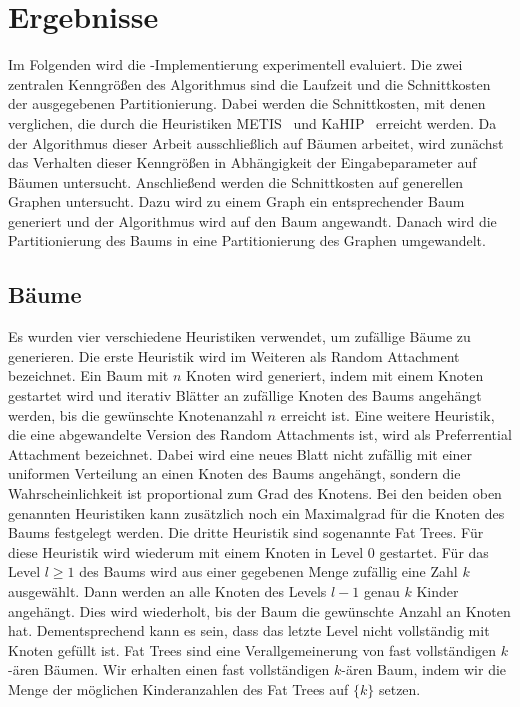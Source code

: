 
\chapter{Ergebnisse}\label{chapter:ergebnisse}
Im Folgenden wird die \Cpp\hyp Implementierung experimentell evaluiert.
Die zwei zentralen Kenngrößen des Algorithmus sind die Laufzeit und die Schnittkosten der ausgegebenen Partitionierung.
Dabei werden die Schnittkosten, mit denen verglichen, die durch die Heuristiken METIS~\cite{KK98} und KaHIP~\cite{SS13} erreicht werden.
Da der Algorithmus dieser Arbeit ausschließlich auf Bäumen arbeitet, wird zunächst das Verhalten dieser Kenngrößen in Abhängigkeit der Eingabeparameter auf Bäumen untersucht.
Anschließend werden die Schnittkosten auf generellen Graphen untersucht.
Dazu wird zu einem Graph ein entsprechender Baum generiert und der Algorithmus wird auf den Baum angewandt.
Danach wird die Partitionierung des Baums in eine Partitionierung des Graphen umgewandelt.

\section{Bäume}
Es wurden vier verschiedene Heuristiken verwendet, um zufällige Bäume zu generieren.
Die erste Heuristik wird im Weiteren als Random Attachment bezeichnet. 
Ein Baum mit $n$ Knoten wird generiert, indem mit einem Knoten gestartet wird und iterativ Blätter an zufällige Knoten des Baums angehängt werden, bis die gewünschte Knotenanzahl $n$ erreicht ist.
Eine weitere Heuristik, die eine abgewandelte Version des Random Attachments ist, wird als Preferrential Attachment bezeichnet.
Dabei wird eine neues Blatt nicht zufällig mit einer uniformen Verteilung an einen Knoten des Baums angehängt, sondern die Wahrscheinlichkeit ist proportional zum Grad des Knotens.
Bei den beiden oben genannten Heuristiken kann zusätzlich noch ein Maximalgrad für die Knoten des Baums festgelegt werden.
Die dritte Heuristik sind sogenannte Fat Trees.
Für diese Heuristik wird wiederum mit einem Knoten in Level $0$ gestartet.
Für das Level $l \geq 1$ des Baums wird aus einer gegebenen Menge zufällig eine Zahl $k$ ausgewählt.
Dann werden an alle Knoten des Levels $l - 1$ genau $k$ Kinder angehängt.
Dies wird wiederholt, bis der Baum die gewünschte Anzahl an Knoten hat. 
Dementsprechend kann es sein, dass das letzte Level nicht vollständig mit Knoten gefüllt ist.
Fat Trees sind eine Verallgemeinerung von fast vollständigen $k$\hyp ären Bäumen.
Wir erhalten einen fast vollständigen $k$\hyp ären Baum, indem wir die Menge der möglichen Kinderanzahlen des Fat Trees auf $\{k\}$ setzen.

